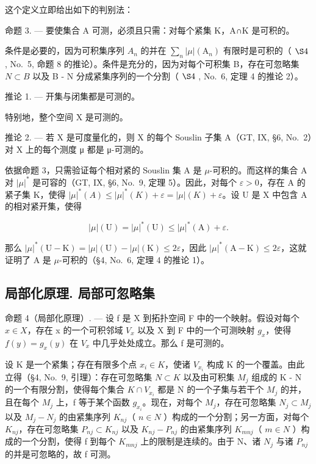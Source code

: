 这个定义立即给出如下的判别法：

命题 3. --- 要使集合 A 可测，必须且只需：对每个紧集 K，A∩K 是可积的。

条件是必要的，因为可积集序列 \(A_{n}\) 的并在 \(\sum_{n}|\mu|(\mathrm{A}_{n})\) 有限时是可积的（ \(\S4\) , No.~5, 命题 8 的推论）。条件是充分的，因为对每个可积集 B，存在可忽略集 \(N \subset B\) 以及 B - N 分成紧集序列的一个分割（ \(\S4\) , No.~6, 定理 4 的推论 2）。

推论 1. --- 开集与闭集都是可测的。

特别地，整个空间 \(\mathrm{X}\) 是可测的。

推论 2. --- 若 X 是可度量化的，则 X 的每个 Souslin 子集 A（GT, IX, §6, No.~2）对 X 上的每个测度 μ 都是 μ-可测的。

依据命题 3，只需验证每个相对紧的 Souslin 集 A 是 \(\mu\)-可积的。而这样的集合 A 对 \(|\mu|^*\) 是可容的（GT, IX, §6, No.~9, 定理 5）。因此，对每个 \(\varepsilon > 0\)，存在 A 的紧子集 K，使得 \(|\mu|^*(A) \leqslant |\mu|^*(K) + \varepsilon = |\mu|(K) + \varepsilon\)。设 U 是 X 中包含 A 的相对紧开集，使得

\[
| \mu | (\mathrm{U}) = | \mu | ^ {*} (\mathrm{U}) \leqslant | \mu | ^ {*} (\mathrm{A}) + \varepsilon .
\]

那么 \(|\mu|^*(\mathrm{U} - \mathrm{K}) = |\mu|(\mathrm{U}) - |\mu|(\mathrm{K}) \leqslant 2\varepsilon\)，因此 \(|\mu|^*(\mathrm{A} - \mathrm{K}) \leqslant 2\varepsilon\)，这就证明了 A 是 \(\mu\)-可积的（§4, No.~6, 定理 4 的推论 1）。

\subsection{局部化原理. 局部可忽略集}

命题 4（局部化原理）. --- 设 f 是 X 到拓扑空间 F 中的一个映射。假设对每个 \(x \in X\)，存在 x 的一个可积邻域 \(V_{x}\) 以及 X 到 F 中的一个可测映射 \(g_{x}\)，使得 \(f(y) = g_{x}(y)\) 在 \(V_{x}\) 中几乎处处成立。那么 f 是可测的。

设 K 是一个紧集；存在有限多个点 \(x_{i} \in K\)，使诸 \(V_{x_{i}}\) 构成 K 的一个覆盖。由此立得（§4, No.~9, 引理）：存在可忽略集 \(N \subset K\) 以及由可积集 \(M_{j}\) 组成的 K - N 的一个有限分割，使得每个集合 \(K \cap V_{x_{i}}\) 都是 N 的一个子集与若干个 \(M_{j}\) 的并，且在每个 \(M_{j}\) 上，f 等于某个函数 \(g_{x_{i}}\)。现在，对每个 \(M_{j}\)，存在可忽略集 \(N_{j} \subset M_{j}\) 以及 \(M_{j} - N_{j}\) 的由紧集序列 \(K_{nj}\)（ \(n \in N\) ）构成的一个分割；另一方面，对每个 \(K_{nj}\)，存在可忽略集 \(P_{nj} \subset K_{nj}\) 以及 \(K_{nj} - P_{nj}\) 的由紧集序列 \(K_{mnj}\)（ \(m \in N\) ）构成的一个分割，使得 f 到每个 \(K_{mnj}\) 上的限制是连续的。由于 N、诸 \(N_{j}\) 与诸 \(P_{nj}\) 的并是可忽略的，故 f 可测。

